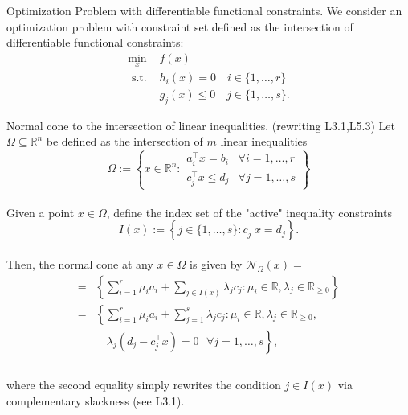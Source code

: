 
\begin{remark}[L7.1]{Optimization Problem with differentiable functional constraints.}
    We consider an optimization problem with constraint set defined as the intersection of differentiable functional constraints: 
    \begin{equation}
        \begin{array}{ll}
            \min _x & f(x) \\
            \text { s.t. } & h_i(x)=0 \quad i \in\{1, \ldots, r\} \\
            & g_j(x) \leq 0 \quad j \in\{1, \ldots, s\}.
        \end{array} \tag{1, P}
    \end{equation}
    \vspace{-7pt}
\end{remark}


\begin{theorem}[L7.1]{Normal cone to the intersection of linear inequalities. (rewriting L3.1,L5.3)}
    Let $\Omega \subseteq \mathbb{R}^n$ be defined as the intersection of $m$ linear inequalities
    \vspace{-4pt}\\
    {\footnotesize$$
    \Omega:=\left\{x \in \mathbb{R}^n: \begin{array}{ll}
        a_i^{\top} x=b_i & \forall i=1, \ldots, r \\
        c_j^{\top} x \leq d_j & \forall j=1, \ldots, s
        \end{array}\right\}
    $$}
    \vspace{-4pt}\\
    Given a point $x \in \Omega$, define the index set of the "active" inequality constraints
    \vspace{-4pt}\\
    $$
    I(x):=\left\{j \in\{1, \ldots, s\}: c_j^{\top} x=d_j\right\} .
    $$
    \vspace{-4pt}\\
    Then, the normal cone at any $x \in \Omega$ is given by $\mathcal{N}_{\Omega}(x)={}$
    \vspace{-4pt}\\
    {\footnotesize
    $$
    \begin{aligned}
    =&\left\{\sum_{i=1}^r \mu_i a_i+\sum_{j \in I(x)} \lambda_j c_j: \mu_i \in \mathbb{R}, \lambda_j \in \mathbb{R}_{\geq 0}\right\} \\
    =&\left\{\sum_{i=1}^r \mu_i a_i+\sum_{j=1}^s \lambda_j c_j: \mu_i \in \mathbb{R}, \lambda_j \in \mathbb{R}_{\geq 0}\right.,\\
    &\quad\left.\lambda_j\left(d_j-c_j^{\top} x\right)=0 \text{ } \forall j=1, \ldots, s\right\},\\
    \end{aligned}
    $$
    }
    \vspace{-4pt}\\
    where the second equality simply rewrites the condition $j \in I(x)$ via complementary slackness (see L3.1).
\end{theorem}

